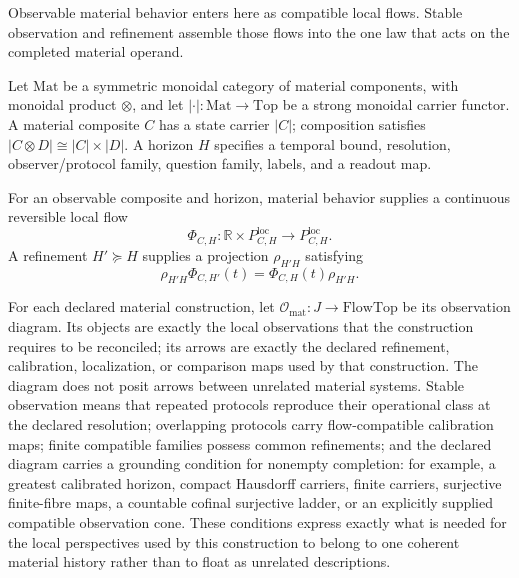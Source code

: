 \documentclass[11pt]{article}
\theoremstyle{definition}
\newcommand{\Omat}{\mathcal{O}_{\mathrm{mat}}}
\begin{document}
Observable material behavior enters here as compatible local flows. Stable observation and refinement assemble those flows into the one law that acts on the completed material operand.

Let $\mathrm{Mat}$ be a symmetric monoidal category of material components, with monoidal product $\otimes$, and let $|\cdot| : \mathrm{Mat} \to \mathrm{Top}$ be a strong monoidal carrier functor. A material composite $C$ has a state carrier $|C|$; composition satisfies $|C \otimes D| \cong |C| \times |D|$. A horizon $H$ specifies a temporal bound, resolution, observer/protocol family, question family, labels, and a readout map.

For an observable composite and horizon, material behavior supplies a continuous reversible local flow
\begin{equation}
\Phi_{C,H} : \mathbb{R} \times P^{\mathrm{loc}}_{C,H} \longrightarrow P^{\mathrm{loc}}_{C,H}. \tag{2}
\end{equation}
A refinement $H' \succeq H$ supplies a projection $\rho_{H'H}$ satisfying
\begin{equation}
\rho_{H'H}\Phi_{C,H'}(t) = \Phi_{C,H}(t)\rho_{H'H}. \tag{3}
\end{equation}

For each declared material construction, let $\Omat : J \to \mathrm{FlowTop}$ be its observation diagram. Its objects are exactly the local observations that the construction requires to be reconciled; its arrows are exactly the declared refinement, calibration, localization, or comparison maps used by that construction. The diagram does not posit arrows between unrelated material systems. Stable observation means that repeated protocols reproduce their operational class at the declared resolution; overlapping protocols carry flow-compatible calibration maps; finite compatible families possess common refinements; and the declared diagram carries a grounding condition for nonempty completion: for example, a greatest calibrated horizon, compact Hausdorff carriers, finite carriers, surjective finite-fibre maps, a countable cofinal surjective ladder, or an explicitly supplied compatible observation cone. These conditions express exactly what is needed for the local perspectives used by this construction to belong to one coherent material history rather than to float as unrelated descriptions.
\end{document}
